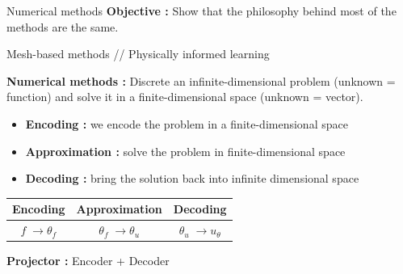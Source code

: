 \begin{frame}{Numerical methods}
	\textbf{Objective :} Show that the philosophy behind most of the methods are the same.
	\begin{center}
		Mesh-based methods \hspace{5pt} // \hspace{5pt} Physically informed learning
	\end{center}
	
	\textbf{Numerical methods :} Discrete an infinite-dimensional problem (unknown = function) and solve it in a finite-dimensional space (unknown = vector).
	\begin{itemize}[\textbullet]
		\item \textbf{Encoding :} we encode the problem in a finite-dimensional space
		\item \textbf{Approximation :} solve the problem in finite-dimensional space
		\item \textbf{Decoding :} bring the solution back into infinite dimensional space
	\end{itemize}
	
	\begin{center}
		\begin{tabular}{|c|c|c|}
			\hline
			\textbf{Encoding} & \textbf{Approximation} & \textbf{Decoding} \\
			\hline
			$f \; \rightarrow \theta_f$ & $\theta_f \; \rightarrow \theta_u$ & $\theta_u \; \rightarrow u_\theta$ \\
			\hline
		\end{tabular}
	\end{center}

	\bigskip

	\textbf{Projector :} Encoder + Decoder
	\begin{figure}[htb]
		\vspace{-10pt}
	\end{figure}
\end{frame}
